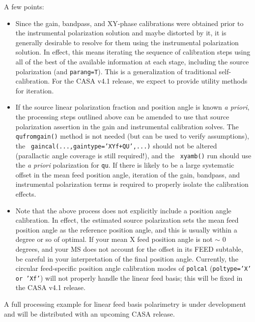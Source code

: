 A few points:

\begin{itemize}

\item Since the gain, bandpass, and XY-phase calibrations were obtained
prior to the instrumental polarization solution and maybe distorted by
it, it is generally desirable to resolve for them using the
instrumental polarization solution.  In effect, this means iterating
the sequence of calibration steps using all of the best of the
available information at each stage, including the source
polarization (and {\tt parang=T}).  This is a generalization
of traditional self-calibration.  For the CASA v4.1 release,
we expect to provide utility methods for iteration.

\item If the source linear polarization fraction and position angle is
known {\em a priori}, the processing steps outlined above can be
amended to use that source polarization assertion in the gain and
instrumental calibration solves.  The {\tt qufromgain()} method is not
needed (but can be used to verify assumptions), the {\tt
gaincal(...,gaintype='XYf+QU',...)} should not be altered (parallactic
angle coverage is still required!), and the {\tt
xyamb()} run should use the {\em a priori} polarization for {\tt qu}.
If there is likely to be a large systematic offset in the mean
feed position angle, iteration of the gain, bandpass, and instrumental
polarization terms is required to properly isolate the calibration
effects.

\item Note that the above process does not explicitly include a position
angle calibration.  In effect, the estimated source polarization sets
the mean feed position angle as the reference position angle, and this
is usually within a degree or so of optimal.  If your mean X feed
position angle is not $\sim$ 0 degrees, and your MS does not account
for the offset in its FEED subtable, be careful in your interpretation
of the final position angle. Currently, the circular feed-specific
position angle calibration modes of {\tt polcal} ({\tt poltype='X' or
'Xf'}) will not properly handle the linear feed basis; this will
be fixed in the CASA v4.1 release.

\end{itemize}


A full processing example for linear feed basis polarimetry is under
development and will be distributed with an upcoming CASA release.

